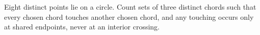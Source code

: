 Eight distinct points lie on a circle. Count sets of three distinct chords such that every chosen chord touches another chosen chord, and any touching occurs only at shared endpoints, never at an interior crossing.
